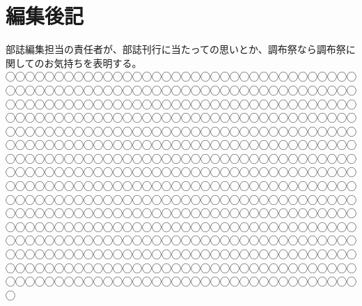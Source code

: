 \documentclass[../super_nova_20yy]{subfiles}
\begin{document}
\chapter{編集後記}
\vspace{2\zw}
部誌編集担当の責任者が、部誌刊行に当たっての思いとか、調布祭なら調布祭に関してのお気持ちを表明する。◯◯◯◯◯◯◯◯◯◯◯◯◯◯◯◯◯◯◯◯◯◯◯◯◯◯◯◯◯◯◯◯◯◯◯◯◯◯◯◯◯◯◯◯◯◯◯◯◯◯◯◯◯◯◯◯◯◯◯◯◯◯◯◯◯◯◯◯◯◯◯◯◯◯◯◯◯◯◯◯◯◯◯◯◯◯◯◯◯◯◯◯◯◯◯◯◯◯◯◯◯◯◯◯◯◯◯◯◯◯◯◯◯◯◯◯◯◯◯◯◯◯◯◯◯◯◯◯◯◯◯◯◯◯◯◯◯◯◯◯◯◯◯◯◯◯◯◯◯◯◯◯◯◯◯◯◯◯◯◯◯◯◯◯◯◯◯◯◯◯◯◯◯◯◯◯◯◯◯◯◯◯◯◯◯◯◯◯◯◯◯◯◯◯◯◯◯◯◯◯◯◯◯◯◯◯◯◯◯◯◯◯◯◯◯◯◯◯◯◯◯◯◯◯◯◯◯◯◯◯◯◯◯◯◯◯◯◯◯◯◯◯◯◯◯◯◯◯◯◯◯◯◯◯◯◯◯◯◯◯◯◯◯◯◯◯◯◯◯◯◯◯◯◯◯◯◯◯◯◯◯◯◯◯◯◯◯◯◯◯◯◯◯◯◯◯◯◯◯◯◯◯◯◯◯◯◯◯◯◯◯◯◯◯◯◯◯◯◯◯◯◯◯◯◯◯◯◯◯◯◯◯◯◯◯◯◯◯◯◯◯◯◯◯◯◯◯◯◯◯◯◯◯◯◯◯◯◯◯◯◯◯◯◯◯◯◯◯◯◯◯◯◯◯◯◯◯◯◯◯◯◯◯◯◯◯◯◯◯◯◯◯◯◯◯◯◯◯◯◯◯◯◯◯◯◯◯◯◯◯◯◯◯◯◯◯◯◯◯◯◯◯◯◯◯◯◯◯◯◯◯◯◯◯◯◯◯◯◯◯◯◯◯◯◯◯◯◯◯◯◯◯◯◯◯◯◯◯◯◯◯◯◯◯◯◯◯◯◯◯◯◯◯◯◯◯◯◯◯◯◯◯◯◯◯◯◯◯◯◯◯◯◯◯◯◯◯◯◯◯◯◯◯◯◯◯◯◯◯◯◯◯◯◯◯◯◯◯◯◯◯◯◯◯◯◯◯◯◯◯◯◯◯◯◯◯◯◯◯◯◯◯◯◯◯◯◯◯◯◯◯◯◯◯◯◯◯◯◯◯◯◯◯◯◯◯◯◯◯◯◯◯◯◯◯◯◯

\vspace{2\zw}
\end{document}

